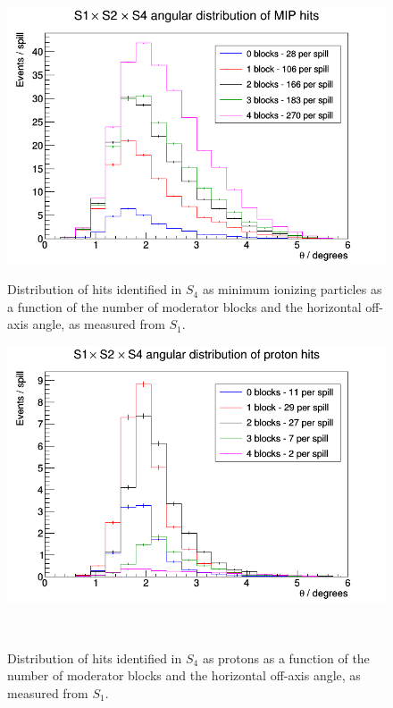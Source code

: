    	\begin{figure}[ht]
   		\begin{minipage}[t]{0.48\textwidth}
   			\centering
	   		\includegraphics[width=\textwidth]{files/Figures/piS4Horz}
	   		\caption{Distribution of hits identified in $S_{4}$ as minimum ionizing particles as a function of the number of moderator blocks and the horizontal off-axis angle, as measured from $S_{1}$.}
   		\end{minipage}
   		\hspace{0.3cm}
   		\begin{minipage}[t]{0.48\textwidth}
   			\centering
   			\includegraphics[width=\textwidth]{files/Figures/proS4Horz}
   			\caption{Distribution of hits identified in $S_{4}$ as protons as a function of the number of moderator blocks and the horizontal off-axis angle, as measured from $S_{1}$.}
   		\end{minipage} \\
   	

\end{figure}

